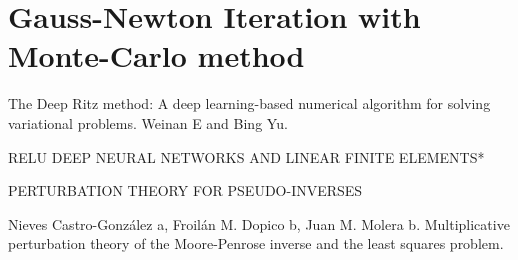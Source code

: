 \documentclass[a4paper, 11pt]{article}
\numberwithin{equation}{section}
\begin{document}

\section{Gauss-Newton Iteration with Monte-Carlo method}


\begin{thebibliography}{9}

\small

The Deep Ritz method: A deep learning-based numerical algorithm for solving variational problems. Weinan E and Bing Yu.

RELU DEEP NEURAL NETWORKS AND LINEAR FINITE ELEMENTS*

PERTURBATION THEORY FOR PSEUDO-INVERSES

Nieves Castro-Gonz\' alez a, Froil\' an M. Dopico b, Juan M. Molera b. Multiplicative perturbation theory of the Moore-Penrose inverse and the least squares problem.

\end{thebibliography}
\end{document}
